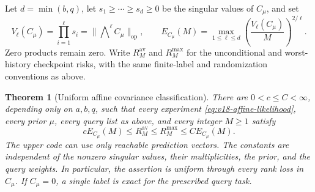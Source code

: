 \documentclass[11pt]{amsart}
\newtheorem{theorem}{Theorem}[section]
\theoremstyle{definition}\newtheorem{definition}[theorem]{Definition}
\theoremstyle{remark}\newtheorem{remark}[theorem]{Remark}
\begin{document}
Let $d=\min(b,q)$, let $s_1\ge\cdots\ge s_d\ge0$ be the singular
values of $C_\mu$, and set
\begin{equation}\label{eq:v18-affine-profile}
 V_\ell(C_\mu)=\prod_{i=1}^\ell s_i
             =\|\mathop{\bigwedge}\nolimits^\ell C_\mu\|_{\mathrm{op}},
 \qquad
 E_{C_\mu}(M)=\max_{1\le\ell\le d}
           \left(\frac{V_\ell(C_\mu)}{M}\right)^{2/\ell}.
\end{equation}
Zero products remain zero. Write $R^{\mathrm{av}}_M$ and
$R^{\mathrm{max}}_M$ for the unconditional and worst-history checkpoint
risks, with the same finite-label and randomization conventions as above.

\begin{theorem}[Uniform affine covariance classification]
\label{thm:v18-affine-classification}
There are $0<c\le C<\infty$, depending only on $a,b,q$, such that every
experiment \eqref{eq:v18-affine-likelihood}, every prior $\mu$, every
query list as above, and every integer $M\ge1$ satisfy
\begin{equation}\label{eq:v18-affine-law}
 cE_{C_\mu}(M)\le R^{\mathrm{av}}_M
 \le R^{\mathrm{max}}_M\le CE_{C_\mu}(M).
\end{equation}
The upper code can use only reachable prediction vectors. The constants
are independent of the nonzero singular values, their multiplicities,
the prior, and the query weights. In particular, the assertion is
uniform through every rank loss in $C_\mu$. If $C_\mu=0$, a single
label is exact for the prescribed query task.
\end{theorem}
\end{document}
